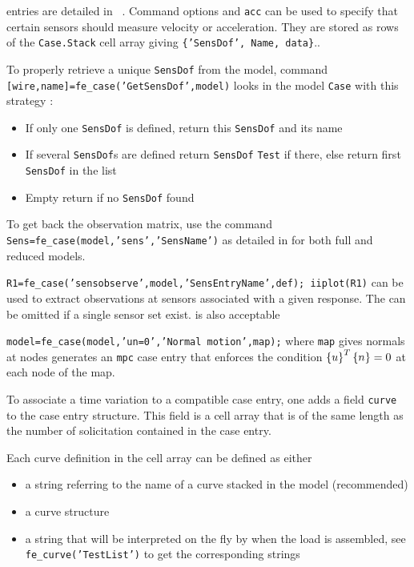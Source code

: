  entries are detailed in ~. Command options  and {\tt acc} can be used to specify that certain sensors should measure velocity or acceleration. They are stored as rows of the {\tt Case.Stack} cell array giving {\tt \{'SensDof', Name, data\}}.. 

To properly retrieve a unique {\tt SensDof} from the model, command {\tt [wire,name]=fe\_case('GetSensDof',model)} looks in the model {\tt Case} with this strategy :
\begin{itemize}
\item If only one {\tt SensDof} is defined, return this {\tt SensDof} and its name
\item If several {\tt SensDof}s are defined return {\tt SensDof} {\tt Test} if there, else return first {\tt SensDof} in the list
\item Empty return if no {\tt SensDof} found
\end{itemize}

To get back the observation matrix, use the command {\tt Sens=fe\_case(model,'sens','SensName')} as detailed in  for both full and reduced models.

{\tt R1=fe\_case('sensobserve',model,'SensEntryName',def); iiplot(R1)} can be used to extract observations at sensors associated with a given response. The  can be omitted if a single sensor set exist.  is also acceptable 


{\tt model=fe\_case(model,'un=0','Normal motion',map);} where {\tt map} gives normals at nodes generates an {\tt mpc} case entry that enforces the condition $\left\{u\right\}^T\left\{n\right\}=0$ at each node of the map.



To associate a time variation to a compatible case entry, one adds a field {\tt curve} to the case entry structure. This field is a cell array that is of the same length as the number of solicitation contained in the case entry. 

Each curve definition in the cell array can be defined as either
\begin{itemize}
\item a string referring to the name of a curve stacked in the model (recommended)
\item a curve structure
\item a string that will be interpreted on the fly by \fecurve when the load is assembled, see {\tt fe\_curve('TestList')} to get the corresponding strings
\end{itemize}

